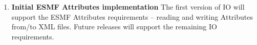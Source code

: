 
\begin{enumerate}

\item {\bf Initial ESMF Attributes implementation}  The first version of IO will
support the ESMF Attributes requirements -- reading and writing Attributes
from/to XML files.  Future releases will support the remaining IO requirements.

\end{enumerate}
